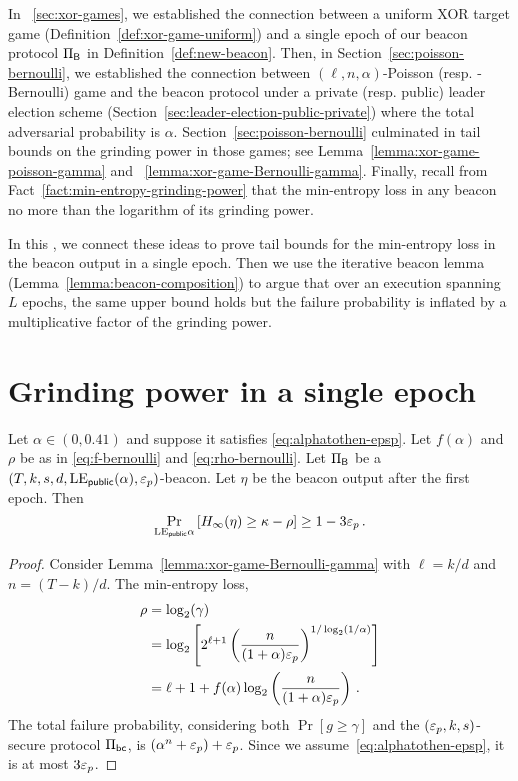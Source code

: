 
In \Section~\ref{sec:xor-games}, 
we established the connection between 
a uniform XOR target game 
(Definition~\ref{def:xor-game-uniform})
and a single epoch of our beacon protocol $\Pi_{\mathsf{B}}$ 
in Definition~\ref{def:new-beacon}.
Then, in Section~\ref{sec:poisson-bernoulli}, 
we established the connection between 
$(\ell,n,\alpha)$-Poisson (resp. -Bernoulli) game 
and the beacon protocol 
under a private (resp. public) leader election scheme 
(Section~\ref{sec:leader-election-public-private})
where the total adversarial probability is $\alpha$. 
Section~\ref{sec:poisson-bernoulli} 
culminated in tail bounds 
on the grinding power in those games; 
see Lemma~\ref{lemma:xor-game-poisson-gamma} and ~\ref{lemma:xor-game-Bernoulli-gamma}. 
Finally, recall from Fact~\ref{fact:min-entropy-grinding-power} 
that the min-entropy loss in any beacon no more than the logarithm of its grinding power. 

In this \Section, we connect these ideas
to prove tail bounds for the min-entropy loss in the beacon output in a single epoch. 
Then we use the iterative beacon lemma (Lemma~\ref{lemma:beacon-composition}) 
to argue that over an execution spanning $L$ epochs, 
the same upper bound holds but the failure probability is inflated by 
a multiplicative factor of the grinding power.



\section{Grinding power in a single epoch}

\begin{lemma}\label{lemma:beacon-bernoulli-single-epoch}
  Let $\alpha \in (0, 0.41)$ and suppose it satisfies \eqref{eq:alphatothen-epsp}.
  Let $f(\alpha)$ and $\rho$ be as in \eqref{eq:f-bernoulli} and \eqref{eq:rho-bernoulli}.
  Let $\Pi_{\mathsf{B}}$ be a $(T,k,s,d,\mathrm{LE}_\mathsf{public}(\alpha), \mathsf{\varepsilon}_p)$-beacon.
  Let $\eta$ be the beacon output after the first epoch. 
  Then 
  \begin{equation}\label{eq:security-bernoulli-single-epoch}
    \Pr_{\mathrm{LE}_\mathsf{public}{\alpha}}\left[H_\infty(\eta) \geq \kappa - \rho \right] \geq 1 - 3 \mathsf{\varepsilon}_p
    \,.
  \end{equation}
\end{lemma}
\begin{proof}  
  Consider Lemma~\ref{lemma:xor-game-Bernoulli-gamma} 
  with $\ell = k/d$ and $n = (T-k)/d$. 
  The min-entropy loss, 
  \begin{align*}
    \rho &= \log_2(\gamma) \\
        &= \log_2 \left[  2^{\ell + 1} \left(
                \frac{n}{(1+\alpha)\mathsf{\varepsilon}_p}
            \right)^{1/\log_2(1/\alpha)}\right] \\
        &= \ell + 1 + f(\alpha) \log_2\left(\frac{n}{(1+\alpha)\mathsf{\varepsilon}_p}\right)
        \,.
  \end{align*}
  The total failure probability, 
  considering both $\Pr[g \geq \gamma]$ and 
  the $(\mathsf{\varepsilon}_p, k, s)$-secure protocol $\Pi_\mathsf{bc}$, 
  is $(\alpha^n + \mathsf{\varepsilon}_p) + \mathsf{\varepsilon}_p$. 
  Since we assume~\eqref{eq:alphatothen-epsp}, it is at most $3 \mathsf{\varepsilon}_p$.
\end{proof}

